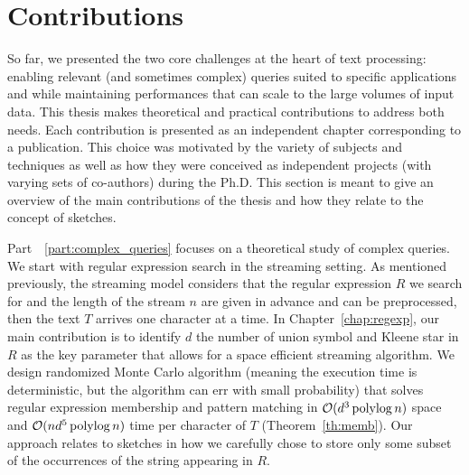  \section{Contributions}\label{intro:sec:contrib}


So far, we presented the two core challenges at the heart of text processing: enabling relevant (and sometimes complex) queries suited to specific applications and while maintaining performances that can scale to the large volumes of input data.
%
This thesis makes theoretical and practical contributions to address both needs. 
Each contribution is presented as an independent chapter corresponding to a publication. This choice was motivated by the variety of subjects and techniques as well as how they were conceived as independent projects (with varying sets of co-authors) during the Ph.D. This section is meant to give an overview of the main contributions of the thesis and how they relate to the concept of sketches.

Part~ \ref{part:complex_queries} focuses on a theoretical study of complex queries. 
%
We start with regular expression search in the streaming setting.
%
As mentioned previously, the streaming model considers that the regular expression $R$ we search for and the length of the stream $n$ are given in advance and can be preprocessed, then the text $T$ arrives one character at a time.
In Chapter~\ref{chap:regexp}, our main contribution is to identify $d$ the number of union symbol and Kleene star in $R$ as the key parameter that allows for a space efficient streaming algorithm. We design randomized Monte Carlo algorithm (meaning the execution time is deterministic, but the algorithm can err with small probability) that solves regular expression membership and pattern matching in $\mathcal{O}(d^3\operatorname{polylog} n)$ space and $\mathcal{O}(nd^5\operatorname{polylog} n)$ time per character of $T$ (Theorem~\ref{th:memb}).
%
Our approach relates to sketches in how we carefully chose to store only some subset of the occurrences of the string appearing in $R$.  





